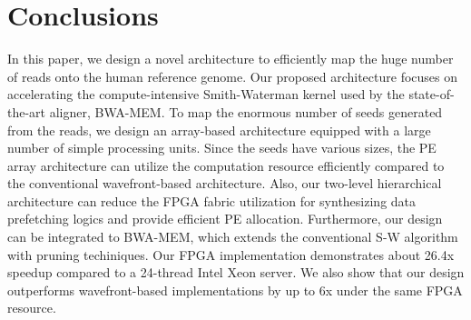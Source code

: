 \section{Conclusions} 
\label{sec:conclusions}
In this paper, we design a novel architecture to efficiently map the huge number of reads onto the human reference genome.
Our proposed architecture focuses on accelerating the compute-intensive Smith-Waterman kernel used by the state-of-the-art aligner, BWA-MEM.
To map the enormous number of seeds generated from the reads, we design an array-based architecture equipped with a large number of simple processing units.
Since the seeds have various sizes, the PE array architecture can utilize the computation resource efficiently compared to the conventional wavefront-based architecture.
Also, our two-level hierarchical architecture can reduce the FPGA fabric utilization for synthesizing data prefetching logics and provide efficient PE allocation.
Furthermore, our design can be integrated to BWA-MEM, which extends the conventional S-W algorithm with pruning techiniques. 
Our FPGA implementation demonstrates about 26.4x speedup compared to a 24-thread Intel Xeon server. 
We also show that our design outperforms wavefront-based implementations by up to 6x under the same FPGA resource.
